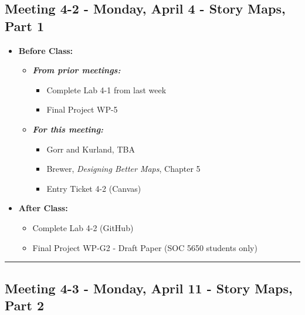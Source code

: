 \documentclass[
]{book}
\providecommand{\tightlist}{%
  \setlength{\itemsep}{0pt}\setlength{\parskip}{0pt}}
\begin{document}
\hypertarget{meeting-4-2---monday-april-4---story-maps-part-1}{%
\subsection*{Meeting 4-2 - Monday, April 4 - Story Maps, Part 1}\label{meeting-4-2---monday-april-4---story-maps-part-1}}

\begin{itemize}
\tightlist
\item
  \textbf{Before Class:}

  \begin{itemize}
  \tightlist
  \item
    \textbf{\emph{From prior meetings:}}

    \begin{itemize}
    \tightlist
    \item
      Complete Lab 4-1 from last week
    \item
      Final Project WP-5
    \end{itemize}
  \item
    \textbf{\emph{For this meeting:}}

    \begin{itemize}
    \tightlist
    \item
      Gorr and Kurland, TBA
    \item
      Brewer, \emph{Designing Better Maps}, Chapter 5
    \item
      Entry Ticket 4-2 (Canvas)
    \end{itemize}
  \end{itemize}
\item
  \textbf{After Class:}

  \begin{itemize}
  \tightlist
  \item
    Complete Lab 4-2 (GitHub)
  \item
    Final Project WP-G2 - Draft Paper (SOC 5650 students only)
  \end{itemize}
\end{itemize}

\begin{center}\rule{0.5\linewidth}{0.5pt}\end{center}

\hypertarget{meeting-4-3---monday-april-11---story-maps-part-2}{%
\subsection*{Meeting 4-3 - Monday, April 11 - Story Maps, Part 2}\label{meeting-4-3---monday-april-11---story-maps-part-2}}
\end{document}
